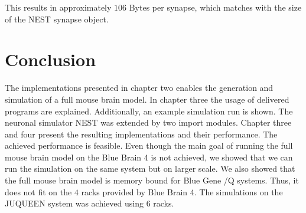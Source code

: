 This results in approximately $106$ Bytes per synapse, which matches with the size of the NEST synapse object.









\newpage
\section{Conclusion}
The implementations presented in chapter two enables the generation and simulation of a full mouse brain model.
In chapter three the usage of delivered programs are explained. Additionally, an example simulation run is shown.
The neuronal simulator NEST was extended by two import modules.
Chapter three and four present the resulting implementations and their performance.
The achieved performance is feasible.
Even though the main goal of running the full mouse brain model on the Blue Brain 4 is not achieved,
we showed that we can run the simulation on the same system but on larger scale.
We also showed  that the full mouse brain model is memory bound for Blue Gene /Q systems.
Thus, it does not fit on the $4$ racks provided by Blue Brain 4. 
The simulations on the JUQUEEN system was achieved using $6$ racks.

